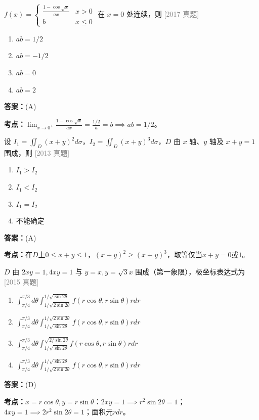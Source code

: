 \documentclass[12pt,a4paper]{ctexbook}
\newcommand{\src}[1]{\hfill\textcolor{gray}{\small\textsf{[#1]}}}
\newcommand{\ans}[1]{\begin{answerbox}\textbf{答案：}#1\end{answerbox}}
\newcommand{\kpt}[1]{\textbf{考点：}#1}
\begin{document}
\begin{exercise}
$f(x)=\begin{cases}\frac{1-\cos\sqrt{x}}{ax}&x>0\\ b&x\leqslant 0\end{cases}$ 在 $x=0$ 处连续，则 \hfill\src{2017 真题}
\begin{enumerate}[label=(\Alph*),nosep]
  \item $ab=1/2$
  \item $ab=-1/2$
  \item $ab=0$
  \item $ab=2$
\end{enumerate}
\end{exercise}
\ans{(A)}
\kpt{$\lim_{x\to0^+}\frac{1-\cos\sqrt{x}}{ax}=\frac{1/2}{a}=b\implies ab=1/2$。}

\begin{exercise}
设 $I_1=\iint_D (x+y)^2 d\sigma$，$I_2=\iint_D (x+y)^3 d\sigma$，$D$ 由 $x$ 轴、$y$ 轴及 $x+y=1$ 围成，则 \hfill\src{2013 真题}
\begin{enumerate}[label=(\Alph*),nosep]
  \item $I_1>I_2$
  \item $I_1<I_2$
  \item $I_1=I_2$
  \item 不能确定
\end{enumerate}
\end{exercise}
\ans{(A)}
\kpt{在$D$上$0\leqslant x+y\leqslant 1$，$(x+y)^2\geqslant (x+y)^3$，取等仅当$x+y=0$或$1$。}

\bigskip

\begin{exercise}
$D$ 由 $2xy=1,4xy=1$ 与 $y=x,y=\sqrt{3}x$ 围成（第一象限），极坐标表达式为 \hfill\src{2015 真题}
\begin{enumerate}[label=(\Alph*),nosep]
  \item $\int_{\pi/4}^{\pi/3}d\theta\int_{1/\sqrt{2\sin 2\theta}}^{1/\sqrt{\sin 2\theta}}f(r\cos\theta,r\sin\theta)rdr$
  \item $\int_{\pi/4}^{\pi/3}d\theta\int_{1/\sqrt{\sin 2\theta}}^{1/\sqrt{2\sin 2\theta}}f(r\cos\theta,r\sin\theta)rdr$
  \item $\int_{\pi/4}^{\pi/3}d\theta\int_{1/\sqrt{\sin 2\theta}}^{\sqrt{2/\sin 2\theta}}f(r\cos\theta,r\sin\theta)rdr$
  \item $\int_{\pi/4}^{\pi/3}d\theta\int_{1/\sqrt{2\sin 2\theta}}^{1/\sqrt{\sin 2\theta}}f(r\cos\theta,r\sin\theta)rdr$
\end{enumerate}
\end{exercise}
\ans{(D)}
\kpt{$x=r\cos\theta,y=r\sin\theta$：$2xy=1\implies r^2\sin2\theta=1$；$4xy=1\implies 2r^2\sin2\theta=1$；面积元$rdr$。}
\end{document}
